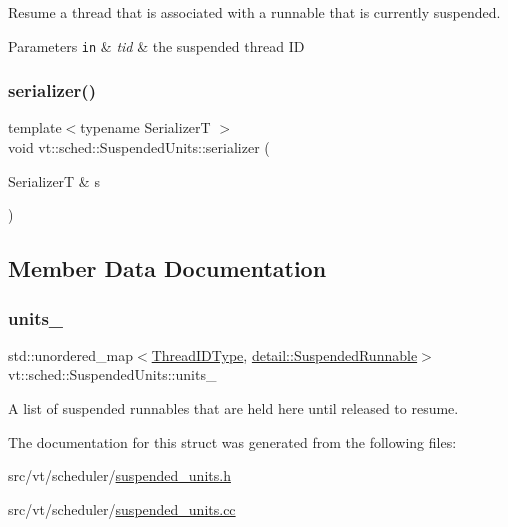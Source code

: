 Resume a thread that is associated with a runnable that is currently suspended. 


\begin{DoxyParams}[1]{Parameters}
\mbox{\tt in}  & {\em tid} & the suspended thread ID \\
\hline
\end{DoxyParams}
\mbox{\label{structvt_1_1sched_1_1_suspended_units_a849db2cdb3218a3c0221b21b6c0defad}} 
\subsubsection{\texorpdfstring{serializer()}{serializer()}}
{\footnotesize\ttfamily template$<$typename SerializerT $>$ \\
void vt\+::sched\+::\+Suspended\+Units\+::serializer (\begin{DoxyParamCaption}\item[{SerializerT \&}]{s }\end{DoxyParamCaption})\hspace{0.3cm}{\ttfamily [inline]}}



\subsection{Member Data Documentation}
\mbox{\label{structvt_1_1sched_1_1_suspended_units_a21eb59ab4bd3b27bbb5f2913a15b0d49}} 
\subsubsection{\texorpdfstring{units\+\_\+}{units\_}}
{\footnotesize\ttfamily std\+::unordered\+\_\+map$<$\hyperlink{namespacevt_a9b887d814dd25ff495a0c8270304ac02}{Thread\+I\+D\+Type}, \hyperlink{structvt_1_1sched_1_1detail_1_1_suspended_runnable}{detail\+::\+Suspended\+Runnable}$>$ vt\+::sched\+::\+Suspended\+Units\+::units\+\_\+\hspace{0.3cm}{\ttfamily [private]}}



A list of suspended runnables that are held here until released to resume. 



The documentation for this struct was generated from the following files\+:\begin{DoxyCompactItemize}
\item 
src/vt/scheduler/\hyperlink{suspended__units_8h}{suspended\+\_\+units.\+h}\item 
src/vt/scheduler/\hyperlink{suspended__units_8cc}{suspended\+\_\+units.\+cc}\end{DoxyCompactItemize}
